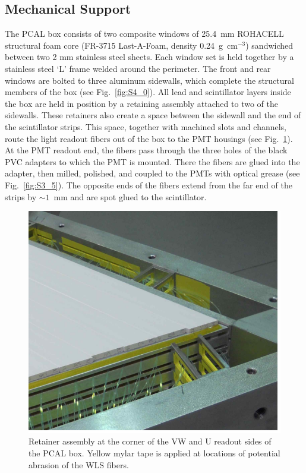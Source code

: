 \subsection{Mechanical Support}

The PCAL box consists of two composite windows of 25.4~mm ROHACELL structural foam core (FR-3715
Last-A-Foam, density 0.24~g~cm$^{-3}$) sandwiched between two 2 mm stainless steel sheets. Each window
set is held together by a stainless steel `L' frame welded around the perimeter. The front and rear windows
are bolted to three aluminum sidewalls, which complete the structural members of the box (see
Fig.~\ref{fig:S4_0}). All lead and scintillator layers inside the box are held in position by a retaining assembly
attached to two of the sidewalls. These retainers also create a space between the sidewall and the end of the
scintillator strips. This space, together with machined slots and channels, route the light readout fibers out of
the box to the PMT housings (see Fig.~\ref{fig:S3_6}).  At the PMT readout end, the fibers pass through the
three holes of the black PVC adapters to which the PMT is mounted.  There the fibers are glued into the adapter,
then milled, polished, and coupled to the PMTs with optical grease (see Fig.~\ref{fig:S3_5}). The opposite ends
of the fibers extend from the far end of the strips by $\sim 1$~mm and are spot glued to the scintillator.   

\begin{figure}[hbt]
\centering
\includegraphics[width=0.95\columnwidth,keepaspectratio]{img/S3_6.png}
\caption[PCAL UVW Layers]{Retainer assembly at the corner of the VW and U readout sides of the PCAL box.
  Yellow mylar tape is applied at locations of potential abrasion of the WLS fibers.}
\label{fig:S3_6}
\end{figure}

